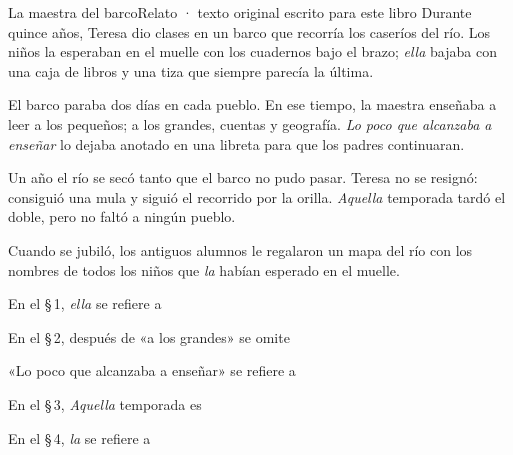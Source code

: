 \bitacora

\evaluacion
\begin{texto}{La maestra del barco}{Relato · texto original escrito para este libro}
\pa Durante quince años, Teresa dio clases en un barco que recorría los caseríos del río. Los niños la esperaban en el
muelle con los cuadernos bajo el brazo; \emph{ella} bajaba con una caja de libros y una tiza que siempre parecía la última.

\pa El barco paraba dos días en cada pueblo. En ese tiempo, la maestra enseñaba a leer a los pequeños; a los grandes,
cuentas y geografía. \emph{Lo poco que alcanzaba a enseñar} lo dejaba anotado en una libreta para que los padres continuaran.

\pa Un año el río se secó tanto que el barco no pudo pasar. Teresa no se resignó: consiguió una mula y siguió el
recorrido por la orilla. \emph{Aquella} temporada tardó el doble, pero no faltó a ningún pueblo.

\pa Cuando se jubiló, los antiguos alumnos le regalaron un mapa del río con los nombres de todos los niños que \emph{la}
habían esperado en el muelle.
\end{texto}
\begin{ejercicios}
\item En el \S\,1, \emph{ella} se refiere a
\item En el \S\,2, después de «a los grandes» se omite
\item «Lo poco que alcanzaba a enseñar»  se refiere a
\item En el \S\,3, \emph{Aquella} temporada es
\item En el \S\,4, \emph{la} se refiere a
\end{ejercicios}
